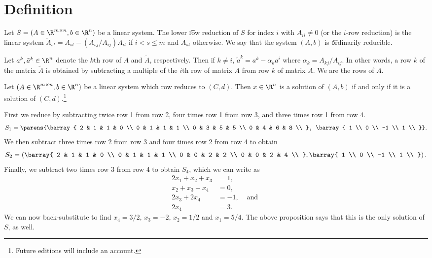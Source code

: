 \section*{Definition}

Let $S = (A \in \R ^{m \times n}, b \in \R ^{n})$ be a linear system.
The lower \t{row reduction} of $S$ for index $i$ with $A_{ii} \neq 0$ (or the $i$-row reduction) is the linear system $\tilde{A}_{st} = A_{st} - (A_{sj}/A_{ij})A_{it}$ if $i < s \leq m$ and $A_{st}$ otherwise.
We say that the system $(A, b)$ is \t{ordinarily reducible}.

Let $a^k, \tilde{a}^k \in \R ^{n}$ denote the $k$th row of $A$ and $\tilde{A}$, respectively.
Then if $k \neq i$, $\tilde{a}^k = a^k - \alpha _k a^i$ where $\alpha _k = A_{kj}/A_{ij}$.
In other words, a row $k$ of the matrix $\tilde{A}$ is obtained by subtracting a multiple of the $i$th row of matrix $A$ from row $k$ of matrix $A$.
We are  the rows of $A$.

\begin{proposition}

\label{propostion:linear_system_reductions:solution_equivalence}Let $(A \in \R ^{m \times n}, b \in \R ^{n})$ be a linear system which row reduces to $(C, d)$.
Then $x \in \R ^{n}$ is a solution of $(A, b)$ if and only if it is a solution of $(C, d)$.\footnote{Future editions will include an account.}\end{proposition}
First we reduce by subtracting twice row 1 from row 2, four times row 1 from row 3, and three times row 1 from row 4.
    \[
S_1 = \parens{\barray{
2 & 1 & 1 & 0 \\
0 & 1 & 1 & 1 \\
0 & 3 & 5 & 5 \\
0 & 4 & 6 & 8 \\
}, \barray{
1 \\
0 \\
-1 \\
1 \\
}}.
    \]
We then subtract three times row 2 from row 3 and four times row 2 from row 4 to obtain
    \[
S_2 = \left(\barray{
2 & 1 & 1 & 0 \\
0 & 1 & 1 & 1 \\
0 & 0 & 2 & 2 \\
0 & 0 & 2 & 4 \\
}, \barray{
1 \\
0 \\
-1 \\
1 \\
}\right).
    \]
Finally, we subtract two times row 3 from row 4 to obtain $S_4$, which we can write as
    \[
\begin{aligned}
2x_1 + x_2 + x_3 &= 1,& \\
x_2 + x_3 + x_4 &= 0,& \\
2x_3 + 2x_4 &= -1,& \text{ and } \\
2x_4 &= 3.&
\end{aligned}
    \]
We can now back-substitute to find $x_4 = 3/2$, $x_3 = -2$, $x_2 = 1/2$ and $x_1 = 5/4$.
The above proposition says that this is the only solution of $S$, as well.
